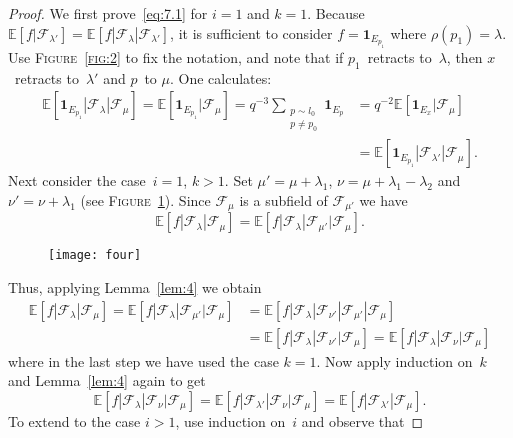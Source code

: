 \documentclass[a4paper]{amsart}
\newcommand{\ind}[1]{{\mathbf{1}_{{#1}}}}
\newcommand{\EE}{\mathbb{E}}
\renewcommand{\atop}[2]{\substack{{#1}\\{#2}}}
\theoremstyle{plain}
\theoremstyle{definition}
\theoremstyle{remark}
\numberwithin{equation}{section}
\theoremstyle{plain}
\begin{document}
\begin{proof}
  We first prove~\eqref{eq:7.1} for $i=1$ and $k=1$.  Because
  $\EE[f|\mathcal{F}_{\lambda'}]
  =\EE[f|\mathcal{F}_\lambda|\mathcal{F}_{\lambda'}]$, it is sufficient
  to consider $f=\ind{E_{p_1}}$ where $\rho(p_1)=\lambda$.  Use
  \textsc{Figure~\ref{fig:2}} to fix the notation, and note that if
  $p_1$~retracts to~$\lambda$, then $x$~retracts to~$\lambda'$ and
  $p$~to $\mu$.  One calculates:
  \begin{align*}
    \EE[\ind{E_{p_1}}| \mathcal{F}_\lambda| \mathcal{F}_\mu] 
    = \EE[\ind{E_{p_1}}| \mathcal{F}_\mu] 
    = q^{-3} \sum_{\atop{p \sim l_0}{p \neq p_0}} \ind{E_p}
    &= q^{-2} \EE[\ind{E_x} | \mathcal{F}_\mu] \\
    & = \EE[\ind{E_{p_1}} | \mathcal{F}_{\lambda'} | \mathcal{F}_\mu].
  \end{align*}
  Next consider the case~$i=1$, $k>1$.  Set $\mu'=\mu+\lambda_1$, $\nu
  = \mu + \lambda_1 - \lambda_2$ and $\nu' = \nu + \lambda_1$ (see
  \textsc{Figure~\ref{fig:4}}). Since $\mathcal{F}_\mu$ is a subfield
  of $\mathcal{F}_{\mu'}$ we have
  \begin{equation*}
    \EE[f | \mathcal{F}_\lambda | \mathcal{F}_\mu] =
    \EE[f | \mathcal{F}_\lambda | \mathcal{F}_{\mu'} | \mathcal{F}_\mu].
  \end{equation*}
	\begin{figure}[h]
		\texttt{[image: four]}
		\caption{}
		\label{fig:4}
	\end{figure}
  Thus, applying Lemma~\ref{lem:4} we obtain
  \begin{align*}
    \EE[f |\mathcal{F}_\lambda | \mathcal{F}_\mu] 
    =\EE[f |\mathcal{F}_\lambda | 
      \mathcal{F}_{\mu'} | \mathcal{F}_\mu] 
    & = \EE[f | \mathcal{F}_\lambda | \mathcal{F}_{\nu'} |
      \mathcal{F}_{\mu'} | \mathcal{F}_\mu] \\
    & = \EE[f | \mathcal{F}_\lambda | \mathcal{F}_{\nu'} | \mathcal{F}_\mu]
    = \EE[f | \mathcal{F}_\lambda | \mathcal{F}_{\nu} | \mathcal{F}_\mu]
  \end{align*}
  where in the last step we have used the case $k = 1$.  Now apply
  induction on~$k$ and Lemma~\ref{lem:4} again to get
  \begin{equation*}
    \EE[f | \mathcal{F}_\lambda | \mathcal{F}_{\nu} | \mathcal{F}_\mu]
    = \EE[f | \mathcal{F}_{\lambda'} | \mathcal{F}_{\nu} |
      \mathcal{F}_\mu]
    = \EE[f | \mathcal{F}_{\lambda'} | \mathcal{F}_\mu]
    .
  \end{equation*}
  To extend to the case $i>1$, use induction on~$i$ and observe that

\end{proof}
\end{document}
